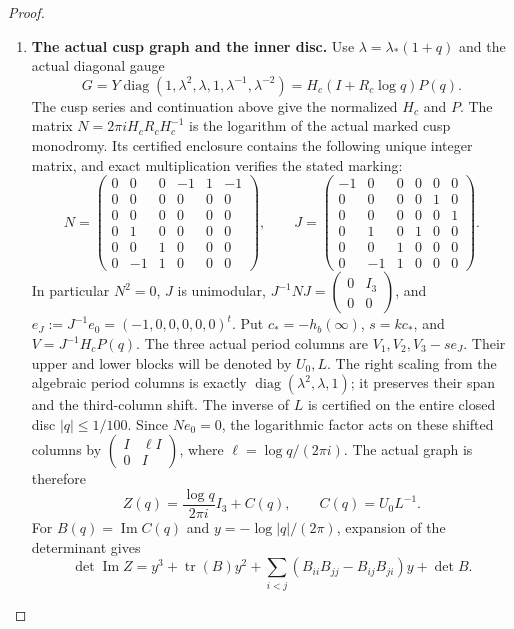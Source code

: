 \begin{proof}
\begin{enumerate}[label=\arabic*.]
\item \textbf{The actual cusp graph and the inner disc.}
Use $\lambda=\lambda_*(1+q)$ and the actual diagonal gauge
\[
 G=Y\operatorname{diag}(1,\lambda^2,\lambda,1,
                         \lambda^{-1},\lambda^{-2})
   =H_c(I+R_c\log q)P(q).
\]
The cusp series and continuation above give the normalized
$H_c$ and $P$. The matrix $N=2\pi iH_cR_cH_c^{-1}$ is the
logarithm of the actual marked cusp monodromy. Its certified
enclosure contains the following unique integer matrix, and
exact multiplication verifies the stated marking:
\[
 N=\begin{pmatrix}
 0&0&0&-1&1&-1\\0&0&0&0&0&0\\0&0&0&0&0&0\\
 0&1&0&0&0&0\\0&0&1&0&0&0\\0&-1&1&0&0&0
 \end{pmatrix},\qquad
 J=\begin{pmatrix}
 -1&0&0&0&0&0\\0&0&0&0&1&0\\0&0&0&0&0&1\\
 0&1&0&1&0&0\\0&0&1&0&0&0\\0&-1&1&0&0&0
 \end{pmatrix}.
\]
In particular $N^2=0$, $J$ is unimodular,
$J^{-1}NJ=\left(\begin{smallmatrix}0&I_3\\0&0\end{smallmatrix}\right)$,
and $e_J:=J^{-1}e_0=(-1,0,0,0,0,0)^t$.
Put $c_*=-h_b(\infty)$, $s=kc_*$, and $V=J^{-1}H_cP(q)$.
The three actual period columns are
$V_1,V_2,V_3-se_J$. Their upper and lower blocks will be
denoted by $U_0,L$. The right scaling from the algebraic period
columns is exactly $\operatorname{diag}(\lambda^2,\lambda,1)$;
it preserves their span and the third-column shift.
The inverse of $L$ is certified on the entire closed disc
$|q|\le1/100$.
Since $Ne_0=0$, the logarithmic factor acts on these shifted
columns by
$\left(\begin{smallmatrix}I&\ell I\\0&I\end{smallmatrix}\right)$,
where $\ell=\log q/(2\pi i)$. The actual graph is therefore
\[
 Z(q)=\frac{\log q}{2\pi i}I_3+C(q),\qquad C(q)=U_0L^{-1}.
\]
For $B(q)=\operatorname{Im}C(q)$ and
$y=-\log|q|/(2\pi)$, expansion of the determinant gives
\[
 \det\operatorname{Im}Z
 =y^3+\operatorname{tr}(B)y^2
  +\sum_{i<j}(B_{ii}B_{jj}-B_{ij}B_{ji})y+\det B.
\]
\end{enumerate}
\end{proof}
